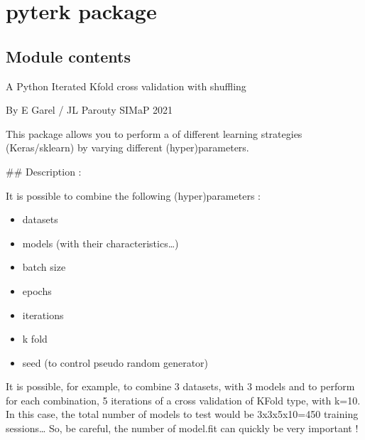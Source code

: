 \documentclass[letterpaper,10pt,english]{sphinxmanual}
\begin{document}
\chapter{pyterk package}
\label{\detokenize{pyterk:pyterk-package}}\label{\detokenize{pyterk::doc}}

\section{Module contents}
\label{\detokenize{pyterk:module-pyterk}}\label{\detokenize{pyterk:module-contents}}
\sphinxAtStartPar
{} \sphinxhyphen{} A Python Iterated K\sphinxhyphen{}fold cross validation with shuffling

\sphinxAtStartPar
By E Garel / JL Parouty \sphinxhyphen{} SIMaP 2021

\sphinxAtStartPar
This package allows you to perform a  of different learning strategies (Keras/sklearn) by varying different (hyper)parameters.

\sphinxAtStartPar
\#\# Description :

\sphinxAtStartPar
It is possible to combine the following (hyper)parameters :
\begin{itemize}
\item {} 
\sphinxAtStartPar
datasets

\item {} 
\sphinxAtStartPar
models (with their characteristics…)

\item {} 
\sphinxAtStartPar
batch size

\item {} 
\sphinxAtStartPar
epochs

\item {} 
\sphinxAtStartPar
iterations

\item {} 
\sphinxAtStartPar
k fold

\item {} 
\sphinxAtStartPar
seed (to control pseudo random generator)

\end{itemize}

\sphinxAtStartPar
It is possible, for example, to combine 3 datasets, with 3 models and to perform for each combination, 5 iterations of a cross validation of KFold type, with k=10.
In this case, the total number of models to test would be 3x3x5x10=450 training sessions…
So, be careful, the number of model.fit can quickly be very important !
\end{document}
